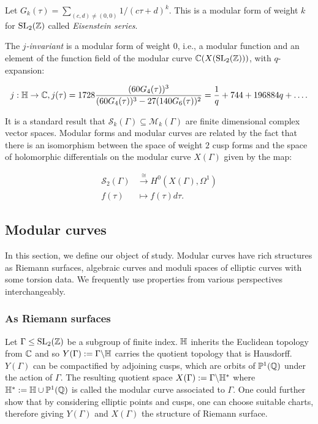 \begin{example}
Let $G_k(\tau) = \sum_{(c,d) \not = (0,0)} 1/(c\tau + d)^k$. This is a modular form of weight $k$ for $\operatorname{SL}_2(\mathbb{Z})$ called \textit{Eisenstein series}. 

    The \textit{$j$-invariant} is a modular form of weight $0$, i.e., a modular function and an element of the function field of the modular curve $\mathbb{C}(X(\operatorname{SL}_2(\mathbb{Z})))$, with $q$-expansion:

    \begin{align*}
        j: \mathbb{H} \rightarrow \mathbb{C}, j(\tau) = 1728 \frac{(60 G_4(\tau))^3}{(60 G_4(\tau))^3 - 27 (140 G_6(\tau))^2} = \frac{1}{q} + 744 + 196884q + \ldots.
    \end{align*}
\end{example}

It is a standard result that $\mathcal{S}_k(\Gamma) \subseteq \mathcal{M}_k(\Gamma)$ are finite dimensional complex vector spaces. Modular forms and modular curves are related by the fact that there is an isomorphism between the space of weight $2$ cusp forms and the space of holomorphic differentials on the modular curve $X(\Gamma)$ given by the map:

\begin{align*}
\mathcal{S}_2(\Gamma) &\xrightarrow{\cong} H^0(X(\Gamma),\Omega^1) \\
f(\tau) &\mapsto f(\tau) d\tau.
\end{align*}



\subsection{Modular curves}
In this section, we define our object of study. Modular curves have rich structures as Riemann surfaces, algebraic curves and moduli spaces of elliptic curves with some torsion data. We frequently use properties from various perspectives interchangeably.

\subsubsection{As Riemann surfaces}
Let $\Gamma \leq \operatorname{SL}_2(\mathbb{Z})$ be a subgroup of finite index. $\mathbb{H}$ inherits the Euclidean topology from $\mathbb{C}$ and so $Y(\Gamma) := \Gamma \backslash \mathbb{H}$ carries the quotient topology that is Hausdorff. $Y(\Gamma)$ can be compactified by adjoining cusps, which are orbits of $\mathbb{P}^1(\mathbb{Q})$ under the action of $\Gamma$. The resulting quotient space $X(\Gamma) := \Gamma \backslash \mathbb{H}^*$ where $\mathbb{H}^* := \mathbb{H} \cup \mathbb{P}^1(\mathbb{Q})$ is called the modular curve associated to $\Gamma$. One could further show that by considering elliptic points and cusps, one can choose suitable charts, therefore giving $Y(\Gamma)$ and $X(\Gamma)$ the structure of Riemann surface.

